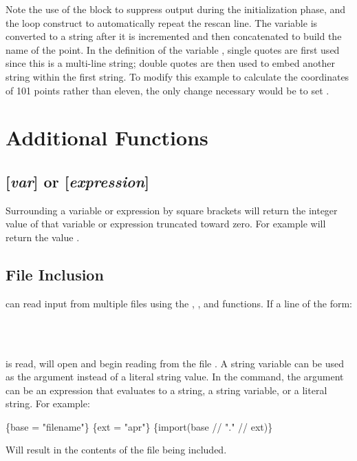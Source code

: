 Note the use of the  block to
suppress output during the initialization phase, and the loop construct
to automatically repeat the rescan line. The variable  is converted
to a string after it is incremented and then concatenated to build the name of
the point. In the definition of the variable , single quotes are first
used since this is a multi-line string; double quotes are then used to embed another
string within the first string. To modify this example to calculate the coordinates
of 101 points rather than eleven, the only change necessary would be to set .

\section{Additional Functions }

\subsection{[{\em var}] or [{\em expression}]} Surrounding a variable or expression
by square brackets will return the integer value of that variable or
expression truncated toward zero. For example \cmd{[sqrt(2)]} will return the value
.

\subsection{File Inclusion}\label{sec:inclusion} \aprepro{} can read input from multiple
files using the , , and  functions. If a line
of the form:

\\
\\

is read, \aprepro{} will open and begin reading from the file
.  A string variable can be used as the argument
instead of a literal string value.  In the  command, the
argument can be an expression that evaluates to a string, a string
variable, or a literal string. For example:
\begin{apinp}
\{base = "filename"\}
\{ext = "apr"\}
\{import(base // "." // ext)\}
\end{apinp}
Will result in the contents of the file  being included.

